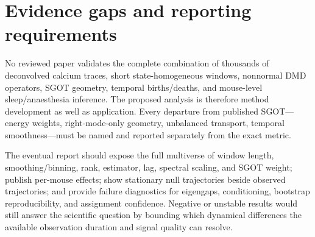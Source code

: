 \documentclass[11pt,a4paper]{article}
\begin{document}
\section{Evidence gaps and reporting requirements}

No reviewed paper validates the complete combination of thousands of deconvolved calcium traces, short state-homogeneous windows, nonnormal DMD operators, SGOT geometry, temporal births/deaths, and mouse-level sleep/anaesthesia inference. The proposed analysis is therefore method development as well as application. Every departure from published SGOT---energy weights, right-mode-only geometry, unbalanced transport, temporal smoothness---must be named and reported separately from the exact metric.

The eventual report should expose the full multiverse of window length, smoothing/binning, rank, estimator, lag, spectral scaling, and SGOT weight; publish per-mouse effects; show stationary null trajectories beside observed trajectories; and provide failure diagnostics for eigengaps, conditioning, bootstrap reproducibility, and assignment confidence. Negative or unstable results would still answer the scientific question by bounding which dynamical differences the available observation duration and signal quality can resolve.

\clearpage
\sloppy


\end{document}
